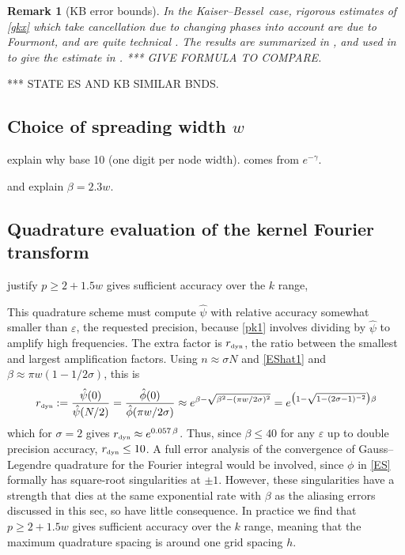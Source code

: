 \documentclass[10pt]{article}
\newcommand{\be}{\begin{equation}}
\newcommand{\ee}{\end{equation}}
\newcommand{\tbox}[1]{{\mbox{\tiny #1}}}
\newcommand{\eps}{\varepsilon}
\newtheorem{rmk}[thm]{Remark}
\newcommand{\freq}{\beta}          %
\newcommand{\rat}{\sigma}          %
\newcommand{\rmax}{r_\tbox{dyn}}    %
\newcommand{\KB}{Kaiser--Bessel}
\begin{document}
\begin{rmk}[KB error bounds]
  \label{fourmont}
  In the \KB\ case, rigorous estimates of \eqref{gkx}
  which take cancellation due to changing phases into account
  are due to Fourmont, and are quite technical \cite[p.~30-38]{fourmontthesis}.
  The results are summarized in \cite[Sec.~4]{fourmont}, and used in
  \cite[p.~30-31]{pottshabil} to give the estimate in \cite[App.~C]{nfft}.
  *** GIVE FORMULA TO COMPARE.
\end{rmk}

*** STATE ES AND KB SIMILAR BNDS.




\subsection{Choice of spreading width $w$}
\label{s:w}

explain why base 10 (one digit per node width).
comes from $e^{-\gamma}$.

and explain $\beta = 2.3 w$.


\subsection{Quadrature evaluation of the kernel Fourier transform}
\label{s:p}

justify  $p\ge 2+1.5 w$ gives sufficient accuracy
over the $k$ range,

This quadrature scheme must compute $\hat\psi$
with relative accuracy
somewhat smaller than $\eps$, the requested precision,
because \eqref{pk1} involves dividing by $\hat\psi$ to amplify
high frequencies.
The extra factor is $\rmax$, the ratio between the smallest and largest
amplification factors. Using $n\approx \rat N$ and
\eqref{EShat1} and $\beta \approx \pi w( 1- 1/2\rat)$,
this is
\be
\rmax := \frac{\hat\psi(0)}{\hat\psi(N/2)}
= \frac{\hat\phi(0)}{\hat\phi(\pi w/2\rat)}
\approx e^{\freq - \sqrt{\freq^2 - (\pi w/2\rat)^2}}
= e^{\bigl(1 - \sqrt{1-(2\rat-1)^{-2}}\bigr)\freq}
\label{rmax}
\ee
which for $\rat=2$ gives $\rmax \approx e^{0.057\,\freq}$.
Thus, since $\beta\le40$ for any $\eps$
up to double precision accuracy, $\rmax\le 10$.
A full error analysis of the convergence of Gauss--Legendre quadrature
for the Fourier integral would be involved, since $\phi$ in \eqref{ES}
formally has square-root singularities at $\pm 1$.
However, these singularities have a strength that dies at the same
exponential rate with $\freq$
as the aliasing errors discussed in this sec, so have
little consequence.
In practice we find that $p\ge 2+1.5 w$ gives sufficient accuracy
over the $k$ range,
meaning that the maximum quadrature spacing is around one
grid spacing $h$.
\end{document}
